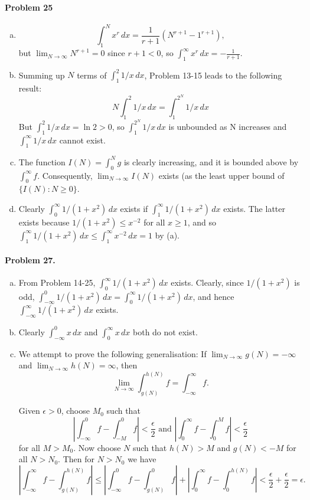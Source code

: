 \documentclass{article}
\begin{document}
\paragraph{Problem 25}
\begin{enumerate}[(a)]
  \item \[
      \int_1^N x^r \,dx = \frac{1}{r + 1}(N^{r + 1} - 1^{r + 1}),
    \] but $\lim_{N \to \infty} N^{r + 1} = 0$ since $r + 1 < 0$, so
    $\int_1^{\infty} x^r \,dx = -\frac{1}{r + 1}$.
  \item Summing up $N$ terms of $\int_1^2 1/x \,dx$, Problem 13-15 leads to the
    following result: \[
      N\int_1^2 1/x \,dx = \int_1^{2^N} 1/x \,dx
    \] But $\int_1^2 1/x \,dx = \ln 2 > 0$, so $\int_1^{2^N} 1/x \,dx$ is
    unbounded as N increases and $\int_1^{\infty} 1/x \,dx$ cannot exist.
  \item The function $I(N) = \int_0^N g$ is clearly increasing, and it is
    bounded above by $\int_0^{\infty} f$. Consequently, $\lim_{N \to \infty}
    I(N)$ exists (as the least upper bound of $\{I(N): N \geq 0\}$.
  \item Clearly $\int_0^{\infty} 1/(1 + x^2) \,dx$ exists if $\int_1^{\infty}
    1/(1 + x^2) \,dx$ exists. The latter exists because $1/(1 + x^2)
    \leq x^{-2}$ for all $x \geq 1$, and so $\int_1^{\infty} 1/(1 + x^2) \,dx
    \leq \int_1^{\infty} x^{-2} \,dx = 1$ by (a).
\end{enumerate}

\paragraph{Problem 27.}
\begin{enumerate}[(a)]
  \item From Problem 14-25, $\int_0^{\infty} 1/(1 + x^2) \,dx$ exists. Clearly,
    since $1/(1 + x^2)$ is odd, $\int_{-\infty}^0 1/(1 + x^2) \,dx =
    \int_0^{\infty} 1/(1 + x^2) \,dx$, and hence $\int_{-\infty}^{\infty}
    1/(1 + x^2) \,dx$ exists.
  \item Clearly $\int_{-\infty}^0 x \,dx$ and $\int_0^{\infty} x \,dx$ both do
    not exist.
  \item We attempt to prove the following generalisation: If
    $\lim_{N \to \infty} g(N) = -\infty$ and $\lim_{N \to \infty} h(N) =
    \infty$, then \[
      \lim_{N \to \infty} \int_{g(N)}^{h(N)} f = \int_{-\infty}^{\infty} f.
    \]

    Given $\epsilon > 0$, choose $M_0$ such that \[
      \left| \int_{-\infty}^0 f - \int_{-M}^0 f \right| < \frac{\epsilon}{2}
      \text{ and } \left| \int_0^{\infty} f - \int_0^M f \right|
      < \frac{\epsilon}{2}
    \] for all $M > M_0$. Now choose $N$ such that $h(N) > M$ and $g(N) < -M$
    for all $N > N_0$. Then for $N > N_0$ we have \[
      \left| \int_{-\infty}^{\infty} f - \int_{g(N)}^{h(N)} f \right|
      \leq \left| \int_{-\infty}^0 f - \int_{g(N)}^0 f \right|
      + \left| \int_0^{\infty} f - \int_0^{h(N)} f \right|
      < \frac{\epsilon}{2} + \frac{\epsilon}{2} = \epsilon.
    \]
\end{enumerate}
\end{document}
